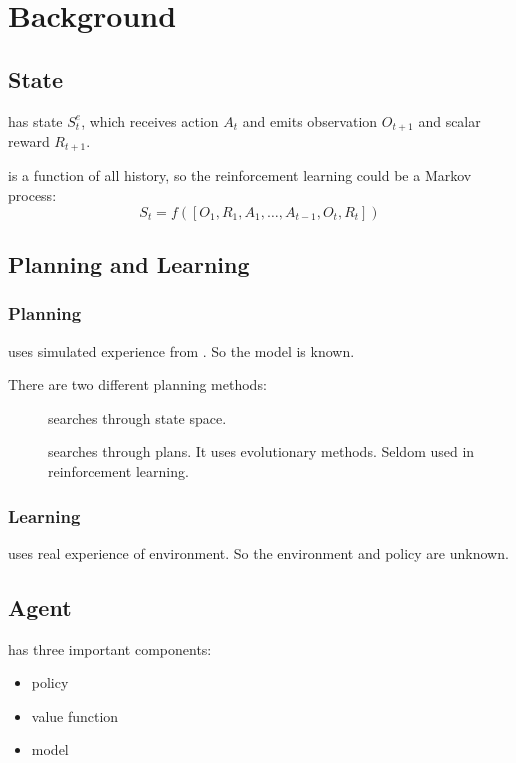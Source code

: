 
\section{Background}


\subsection{State}

 has state $S_t^e$, which receives action $A_t$ and emits observation $O_{t+1}$ and scalar reward $R_{t+1}$.


 is a function of all history, so the reinforcement learning could be a Markov process:
\begin{equation}
	S_t = f([O_1, R_1, A_1, \dots, A_{t-1}, O_t, R_t])
\end{equation}

\subsection{Planning and Learning}

\subsubsection{Planning}

 uses simulated experience from . So the model is known.

There are two different planning methods:
\begin{description}
	\item[] searches through state space.
	\item[] searches through plans. It uses evolutionary methods. Seldom used in reinforcement learning.

\end{description}

\subsubsection{Learning}
 uses real experience of environment. So the environment and policy are unknown.


\subsection{Agent}

 has three important components:
\begin{itemize}
	\item policy
	\item value function
	\item model
\end{itemize}

